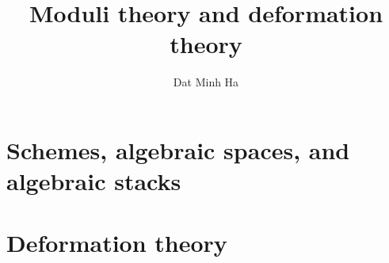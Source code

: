 

\setcounter{section}{-1}





	\title{Moduli theory and deformation theory}
	
	\author{Dat Minh Ha}
	\maketitle
	
	\begin{abstract}
	    
	\end{abstract}
	
	{
      \hypersetup{} 
      \dominitoc
      \tableofcontents %
    }
    
    \chapter{Schemes, algebraic spaces, and algebraic stacks}
        \begin{abstract}
            
        \end{abstract}
        
        \minitoc
    
        
        
        
        
        
        
        \begin{appendices}
            
            
            
        \end{appendices}
        
    \chapter{Deformation theory}
        \begin{abstract}
            
        \end{abstract}
        
        \minitoc
    
